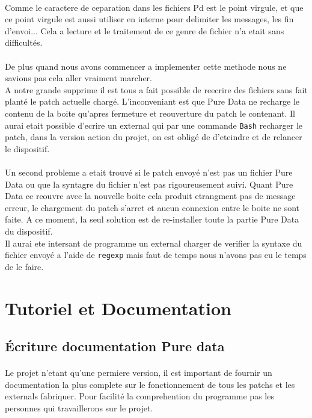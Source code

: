 \documentclass[a4paper, titlepage, oneside, 12pt]{article}%
\begin{document}
\paragraph{}
Comme le caractere de ceparation dans les fichiers Pd est le point virgule, et que ce point virgule est aussi utiliser en interne pour delimiter les messages, les fin d'envoi... Cela a lecture et le traitement de ce genre de fichier n'a etait sans difficultés.
\paragraph{}
De plus quand nous avons commencer a implementer cette methode nous ne savions pas cela aller vraiment marcher.\\
A notre grande supprime il est tous a fait possible de reecrire des fichiers sans fait planté le patch actuelle chargé. L'inconveniant est que Pure Data ne recharge le contenu de la boite qu'apres fermeture et reouverture du patch le contenant. Il aurai etait possible d'ecrire un external qui par une commande \texttt{Bash} recharger le patch, dans la version action du projet, on est obligé de d'eteindre et de relancer le dispositif.
\paragraph{}
Un second probleme a etait trouvé si le patch envoyé n'est pas un fichier Pure Data ou que la syntagre du fichier n'est pas rigoureusement suivi. Quant Pure Data ce reouvre avec la nouvelle boite cela produit etrangment pas de message erreur, le chargement du patch s'arret et aucun connexion entre le boite ne sont faite. A ce moment, la seul solution est de re-installer toute la partie Pure Data du dispositif.\\
Il aurai ete intersant de programme un external charger de verifier la syntaxe du fichier envoyé a l'aide de \texttt{regexp} mais faut de temps nous n'avons pas eu le temps de le faire.   

\section{Tutoriel et Documentation}
\subsection{Écriture documentation Pure data}
\paragraph{}
Le projet n'etant qu'une permiere version, il est important de fournir un documentation la plus complete sur le fonctionnement de tous les patchs et les externals fabriquer. Pour facilité la comprehention du programme pas les personnes qui travaillerons sur le projet.
\end{document}
